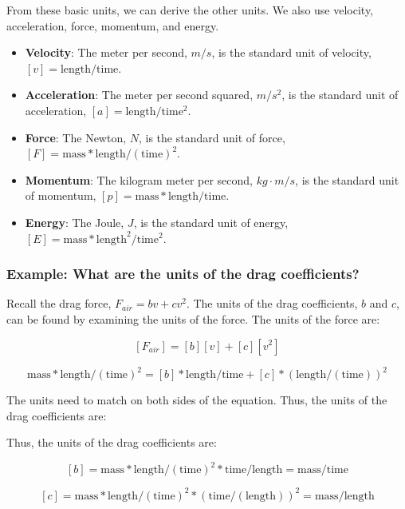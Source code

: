 \documentclass[11pt]{article}
\providecommand{\tightlist}{%
      \setlength{\itemsep}{0pt}\setlength{\parskip}{0pt}}
\begin{document}
From these basic units, we can derive the other units. We also use
velocity, acceleration, force, momentum, and energy.

\begin{itemize}
\tightlist
\item
  \textbf{Velocity}: The meter per second, \(m/s\), is the standard unit
  of velocity, \([v] = \mathrm{length/time}\).
\item
  \textbf{Acceleration}: The meter per second squared, \(m/s^2\), is the
  standard unit of acceleration, \([a] = \mathrm{length/time^2}\).
\item
  \textbf{Force}: The Newton, \(N\), is the standard unit of force,
  \([F] = \mathrm{mass*length/(time)^2}\).
\item
  \textbf{Momentum}: The kilogram meter per second, \(kg\cdot m/s\), is
  the standard unit of momentum, \([p] = \mathrm{mass*length/time}\).
\item
  \textbf{Energy}: The Joule, \(J\), is the standard unit of energy,
  \([E] = \mathrm{mass*length}^2/\mathrm{time}^2\).
\end{itemize}

\subsubsection{Example: What are the units of the drag
coefficients?}\label{example-what-are-the-units-of-the-drag-coefficients}

Recall the drag force, \(F_{air} = bv + cv^2\). The units of the drag
coefficients, \(b\) and \(c\), can be found by examining the units of
the force. The units of the force are:

\[[F_{air}] = [b][v] + [c][v^2]\]

\[\mathrm{mass*length/(time)^2} = [b]*\mathrm{length/time}+ [c]*(\mathrm{length/(time)})^2\]

The units need to match on both sides of the equation. Thus, the units
of the drag coefficients are:

Thus, the units of the drag coefficients are:

\[[b] = \mathrm{mass*length/(time)^2} * \mathrm{time/length} = \mathrm{mass/time}\]

\[[c] = \mathrm{mass*length/(time)^2} * (\mathrm{time/(length)})^2 = \mathrm{mass/length}\]

    

    


    
    
    
\end{document}
